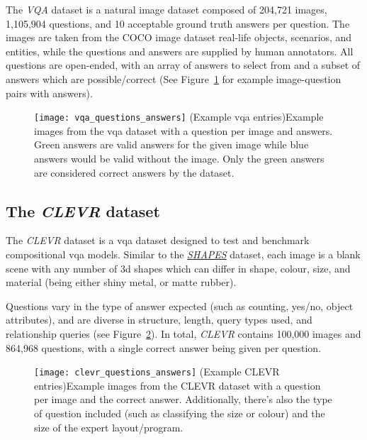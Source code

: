 The \textit{VQA} dataset \cite{agrawal_vqa_2016} is a natural image dataset composed of 204,721 images, 1,105,904 questions, and 10 acceptable ground truth answers per question.
The images are taken from the COCO image dataset \cite{lin_microsoft_2015} real-life objects, scenarios, and entities, while the questions and answers are supplied by human annotators.
All questions are open-ended, with an array of answers to select from and a subset of answers which are possible/correct (See Figure~\ref{fig:vqa_questions_answers} for example image-question pairs with answers).

\begin{figure}[htbp]
    \centering
    \texttt{[image: vqa\_questions\_answers]}
    \captionsource(Example \acrshort{vqa} entries){Example images from the \acrshort{vqa} dataset with a question per image and answers. Green answers are valid answers for the given image while blue answers would be valid without the image. Only the green answers are considered correct answers by the dataset. \label{fig:vqa_questions_answers}}{\citeauthor{agrawal_vqa_2016}\cite{agrawal_vqa_2016}}
\end{figure}

\subsection{The \textit{CLEVR} dataset}
\label{subsec:clevr_dataset}

The \textit{CLEVR} dataset \cite{johnson_clevr_2016} is a \gls{vqa} dataset designed to test and benchmark compositional \gls{vqa} models.
Similar to the \textit{\hyperref[subsec:shapes_dataset]{SHAPES}} dataset, each image is a blank scene with any number of 3d shapes which can differ in shape, colour, size, and material (being either shiny metal, or matte rubber).

Questions vary in the type of answer expected (such as counting, yes/no, object attributes), and are diverse in structure, length, query types used, and relationship queries (see Figure~\ref{fig:clevr_questions_answers}).
In total, \textit{CLEVR} contains 100,000 images and 864,968 questions, with a single correct answer being given per question.

\begin{figure}[htbp]
    \centering
    \texttt{[image: clevr\_questions\_answers]}
    \captionsource(Example CLEVR entries){Example images from the CLEVR dataset with a question per image and the correct answer. Additionally, there's also the type of question included (such as classifying the size or colour) and the size of the expert layout/program. \label{fig:clevr_questions_answers}}{\citeauthor{johnson_clevr_2016}\cite{johnson_clevr_2016}}
\end{figure}

